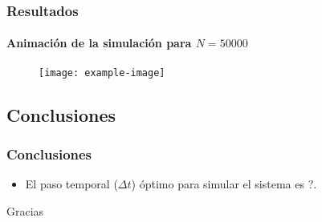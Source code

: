 \documentclass[hyperref={pdfpagelayout=SinglePage}]{beamer}
\begin{document}
\begin{frame}
\frametitle{Resultados}
\framesubtitle{Animación de la simulación para $N = 50000$}
\begin{figure}[H]
	\centering
	\texttt{[image: example-image]}
\end{figure}
\end{frame}

\subsection{Conclusiones}

\begin{frame}
\frametitle{Conclusiones}
\begin{itemize}
	\item El paso temporal ($\Delta t$) óptimo para simular el sistema es ?.
	\end{itemize}	
\end{frame}

\begin{frame}[plain,c]
\begin{center}
	\Huge Gracias
\end{center}
\end{frame}
    
\end{document}
